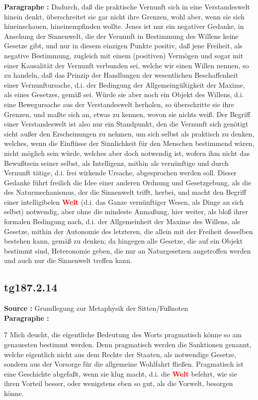 \documentclass[a4paper,12pt,twoside]{book}
\newcommand{\match}[1]{\textcolor{red}{\textbf{#1}}}
\begin{document}
	\noindent\textbf{Paragraphe : }Dadurch, daß die praktische Vernunft sich in eine Verstandeswelt hinein denkt, überschreitet sie gar nicht ihre Grenzen, wohl aber, wenn sie sich hineinschauen, hineinempfinden wollte. Jenes ist nur ein negativer Gedanke, in Ansehung der Sinnenwelt, die der Vernunft in Bestimmung des Willens keine Gesetze gibt, und nur in diesem einzigen Punkte positiv, daß jene Freiheit, als negative Bestimmung, zugleich mit einem (positiven) Vermögen und sogar mit einer Kausalität der Vernunft verbunden sei, welche wir einen Willen nennen, so zu handeln, daß das Prinzip der Handlungen der wesentlichen Beschaffenheit einer Vernunftursache, d.i. der Bedingung der Allgemeingültigkeit der Maxime, als eines Gesetzes, gemäß sei. Würde sie aber noch ein Objekt des Willens, d.i. eine Bewegursache aus der Verstandeswelt herholen, so überschritte sie ihre Grenzen, und maßte sich an, etwas zu kennen, wovon sie nichts weiß. Der Begriff einer Verstandeswelt ist also nur ein Standpunkt, den die Vernunft sich genötigt sieht außer den Erscheinungen zu nehmen, um sich selbst als praktisch zu denken, welches, wenn die Einflüsse der Sinnlichkeit für den Menschen bestimmend wären, nicht möglich sein würde, welches aber doch notwendig ist, wofern ihm nicht das Bewußtsein seiner selbst, als Intelligenz, mithin als vernünftige und durch Vernunft tätige, d.i. frei wirkende Ursache, abgesprochen werden soll. Dieser Gedanke  führt freilich die Idee einer anderen Ordnung und Gesetzgebung, als die des Naturmechanismus, der die Sinnenwelt trifft, herbei, und macht den Begriff einer intelligibelen \match{Welt} (d.i. das Ganze vernünftiger Wesen, als Dinge an sich selbst) notwendig, aber ohne die mindeste Anmaßung, hier weiter, als bloß ihrer formalen Bedingung nach, d.i. der Allgemeinheit der Maxime des Willens, als Gesetze, mithin der Autonomie des letzteren, die allein mit der Freiheit desselben bestehen kann, gemäß zu denken; da hingegen alle Gesetze, die auf ein Objekt bestimmt sind, Heteronomie geben, die nur an Naturgesetzen angetroffen werden und auch nur die Sinnenwelt treffen kann. 
	
	\subsection*{tg187.2.14} 
	\textbf{Source : }Grundlegung zur Metaphysik der Sitten/Fußnoten\\  
	
	\noindent\textbf{Paragraphe : }
	
	7 Mich deucht, die eigentliche Bedeutung des Worts pragmatisch könne so am genauesten bestimmt werden. Denn pragmatisch werden die Sanktionen genannt, welche eigentlich nicht aus dem Rechte der Staaten, als notwendige Gesetze, sondern aus der Vorsorge für die allgemeine Wohlfahrt fließen. Pragmatisch ist eine Geschichte abgefaßt, wenn sie klug macht, d.i. die \match{Welt} belehrt, wie sie ihren Vorteil besser, oder wenigstens eben so gut, als die Vorwelt, besorgen könne. 
	
\end{document}
